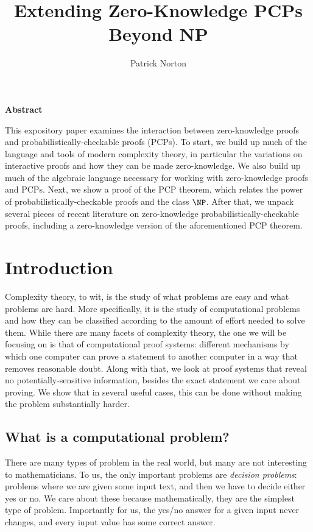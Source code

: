 \documentclass[english,12pt]{reedthesis}
\title{Extending Zero-Knowledge PCPs Beyond NP}
\author{Patrick Norton}
\makeatletter
\theoremstyle{plain}
\theoremstyle{definition}
\theoremstyle{remark}
\renewenvironment{abstract}{%
  \if@twocolumn
    \@restonecoltrue\onecolumn
  \else
    \@restonecolfalse
  \fi
  \chapter*{}
  \begin{center}
  {\fontsize{14}{16}\selectfont \bfseries Abstract}
  \end{center}
  \fontsize{12}{14}\selectfont
}{\clearpage \if@restonecol\twocolumn\fi}%
\makeatother
\begin{document}
\maketitle

\tableofcontents

\listofalgorithms

\begin{abstract}
  This expository paper examines the interaction between zero-knowledge proofs
  and probabilistically-checkable proofs (PCPs). To start, we build up much of
  the language and tools of modern complexity theory, in particular the
  variations on interactive proofs and how they can be made zero-knowledge. We
  also build up much of the algebraic language necessary for working with
  zero-knowledge proofs and PCPs. Next, we show a proof of the PCP theorem,
  which relates the power of probabilistically-checkable proofs and the class
  $\NP$. After that, we unpack several pieces of recent literature on
  zero-knowledge probabilistically-checkable proofs, including a zero-knowledge
  version of the aforementioned PCP theorem.
\end{abstract}

\chapter{Introduction}

Complexity theory, to wit, is the study of what problems are easy and what
problems are hard. More specifically, it is the study of computational problems
and how they can be classified according to the amount of effort needed to solve
them. While there are many facets of complexity theory, the one we will be
focusing on is that of computational proof systems: different mechanisms by
which one computer can prove a statement to another computer in a way that
removes reasonable doubt. Along with that, we look at proof systems that reveal
no potentially-sensitive information, besides the exact statement we care about
proving. We show that in several useful cases, this can be done without making
the problem substantially harder.

\section{What is a computational problem?}

There are many types of problem in the real world, but many are not interesting
to mathematicians. To us, the only important problems are \emph{decision
  problems}: problems where we are given some input text, and then we have to
decide either yes or no. We care about these because mathematically, they are
the simplest type of problem. Importantly for us, the yes/no answer for a given
input never changes, and every input value has some correct answer.
\end{document}
